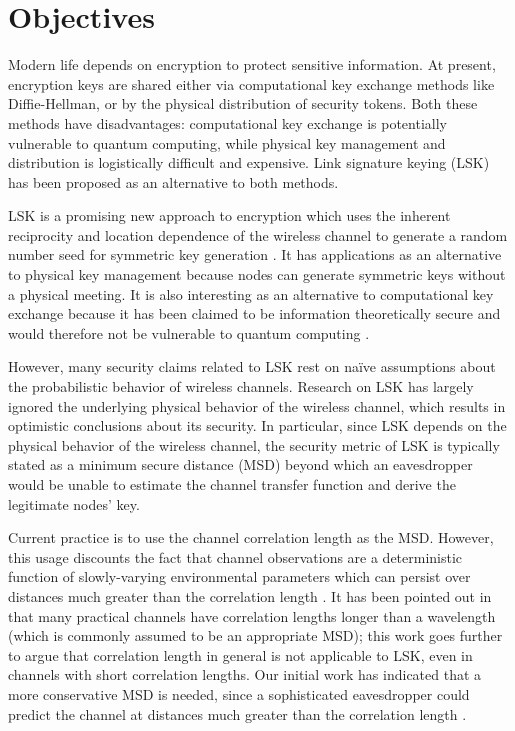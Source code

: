 \documentclass[12pt, titlepage]{article}
\begin{document}
\section*{Objectives}
Modern life depends on encryption to protect sensitive information.  At present, encryption keys are shared either via computational key exchange methods like Diffie-Hellman, or by the physical distribution of security tokens.  Both these methods have disadvantages: computational key exchange is potentially vulnerable to quantum computing, while physical key management and distribution is logistically difficult and expensive.  Link signature keying (LSK) has been proposed as an alternative to both methods.  

LSK is a promising new approach to encryption which uses the inherent reciprocity and location dependence of the wireless channel to generate a random number seed for symmetric key generation \cite{hershey1995, hassan1996, azimisadjadi2007, mathur2008}.  It has applications as an alternative to physical key management because nodes can generate symmetric keys without a physical meeting.  It is also interesting as an alternative to computational key exchange because it has been claimed to be information theoretically secure and would therefore not be vulnerable to quantum computing \cite{ye2010}.  

However, many security claims related to LSK rest on na\"{i}ve assumptions about the probabilistic behavior of wireless channels.  Research on LSK has largely ignored the underlying physical behavior of the wireless channel, which results in optimistic conclusions about its security.  In particular, since LSK depends on the physical behavior of the wireless channel, the security metric of LSK is typically stated as a minimum secure distance (MSD) beyond which an eavesdropper would be unable to estimate the channel transfer function and derive the legitimate nodes' key. 

Current practice is to use the channel correlation length as the MSD.  However, this usage discounts the fact that channel observations are a deterministic function of slowly-varying environmental parameters which can persist over distances much greater than the correlation length \cite{jakes1974, duel-hallen2007}.  It has been pointed out in \cite{he2013} that many practical channels have correlation lengths longer than a wavelength (which is commonly assumed to be an appropriate MSD); this work goes further to argue that correlation length in general is not applicable to LSK, even in channels with short correlation lengths.  Our initial work has indicated that a more conservative MSD is needed, since
a sophisticated eavesdropper could predict the channel at distances much greater than the correlation length \cite{kckpVTC2015, brown2015}.  
\end{document}
